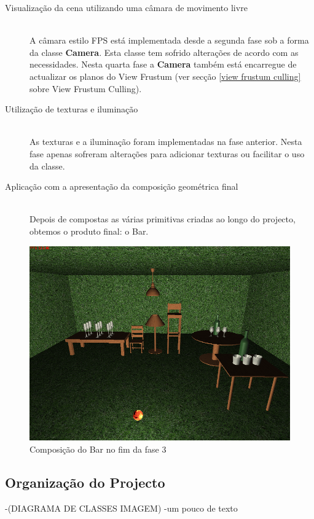\documentclass[a5paper,onecolumn, 11pt]{article}
\begin{document}
\begin{description}
	\item[Visualização da cena utilizando uma câmara de movimento livre] \hfill \\
	A câmara estilo FPS está implementada desde a segunda fase sob a forma da classe \textbf{Camera}. Esta classe tem sofrido alterações de acordo com as necessidades. Nesta quarta fase a \textbf{Camera} também está encarregue de actualizar os planos do View Frustum (ver secção \ref{view frustum culling} sobre View Frustum Culling).
	
	\item[Utilização de texturas e iluminação] \hfill \\
	As texturas e a iluminação foram implementadas na fase anterior. Nesta fase apenas sofreram alterações para adicionar texturas ou facilitar o uso da classe.
	
	\item[Aplicação com a apresentação da composição geométrica final] \hfill \\
	Depois de compostas as várias primitivas criadas ao longo do projecto, obtemos o produto final: o Bar.

\end{description}
\newpage

\begin{figure}[!htb]
    \centering
    \includegraphics[scale=0.5]{fase3.png}
    \caption{Composição do Bar no fim da fase 3}
\end{figure}

\newpage
\onecolumn
\subsection{Organização do Projecto}
-(DIAGRAMA DE CLASSES IMAGEM)
-um pouco de texto
\end{document}
